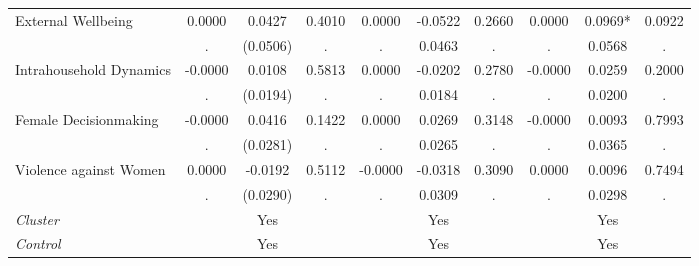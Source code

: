 \begin{tabular}{l*{9}{c}}
External Wellbeing & 0.0000 & 0.0427 & 0.4010 & 0.0000 & -0.0522 & 0.2660 & 0.0000 & 0.0969* & 0.0922 \\
  & . & (0.0506) & . & . & 0.0463 & . & . & 0.0568 & . \\
Intrahousehold Dynamics & -0.0000 & 0.0108 & 0.5813 & 0.0000 & -0.0202 & 0.2780 & -0.0000 & 0.0259 & 0.2000 \\
  & . & (0.0194) & . & . & 0.0184 & . & . & 0.0200 & . \\
Female Decisionmaking & -0.0000 & 0.0416 & 0.1422 & 0.0000 & 0.0269 & 0.3148 & -0.0000 & 0.0093 & 0.7993 \\
  & . & (0.0281) & . & . & 0.0265 & . & . & 0.0365 & . \\
Violence against Women & 0.0000 & -0.0192 & 0.5112 & -0.0000 & -0.0318 & 0.3090 & 0.0000 & 0.0096 & 0.7494 \\
  & . & (0.0290) & . & . & 0.0309 & . & . & 0.0298 & . \\
\hline \textit{Cluster} & & Yes &  & & Yes &  & & Yes &  \\ \textit{Control} & & Yes &  & & Yes &  & & Yes &   \\ \hline \end{tabular}
